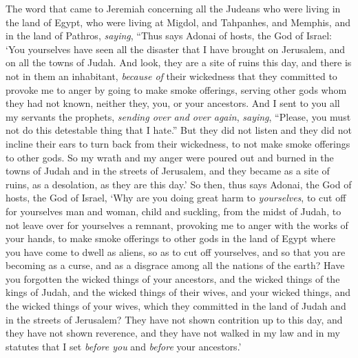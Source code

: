 \begin{biblechapter} %
 The word that came to Jeremiah concerning all the Judeans who were living in the land of Egypt, who were living at Migdol, and Tahpanhes, and Memphis, and in the land of Pathros, \textit{saying},
\verse “Thus says Adonai of hosts, the God of Israel: ‘You yourselves have seen all the disaster that I have brought on Jerusalem, and on all the towns of Judah. And look, they are a site of ruins this day, and there is not in them an inhabitant,
\verse \textit{because of} their wickedness that they committed to provoke me to anger by going to make smoke offerings, serving other gods whom they had not known, neither they, you, or your ancestors.
\verse And I sent to you all my servants the prophets, \textit{sending over and over again}, \textit{saying}, “Please, you must not do this detestable thing that I hate.”
\verse But they did not listen and they did not incline their ears to turn back from their wickedness, to not make smoke offerings to other gods.
\verse So my wrath and my anger were poured out and burned in the towns of Judah and in the streets of Jerusalem, and they became as a site of ruins, as a desolation, as they are this day.’
\verse So then, thus says Adonai, the God of hosts, the God of Israel, ‘Why are you doing great harm to \textit{yourselves}, to cut off for yourselves man and woman, child and suckling, from the midst of Judah, to not leave over for yourselves a remnant,
\verse provoking me to anger with the works of your hands, to make smoke offerings to other gods in the land of Egypt where you have come to dwell as aliens, so as to cut off yourselves, and so that you are becoming as a curse, and as a disgrace among all the nations of the earth?
\verse Have you forgotten the wicked things of your ancestors, and the wicked things of the kings of Judah, and the wicked things of their wives, and your wicked things, and the wicked things of your wives, which they committed in the land of Judah and in the streets of Jerusalem?
\verse They have not shown contrition up to this day, and they have not shown reverence, and they have not walked in my law and in my statutes that I set \textit{before you} and \textit{before} your ancestors.’

\end{biblechapter}
